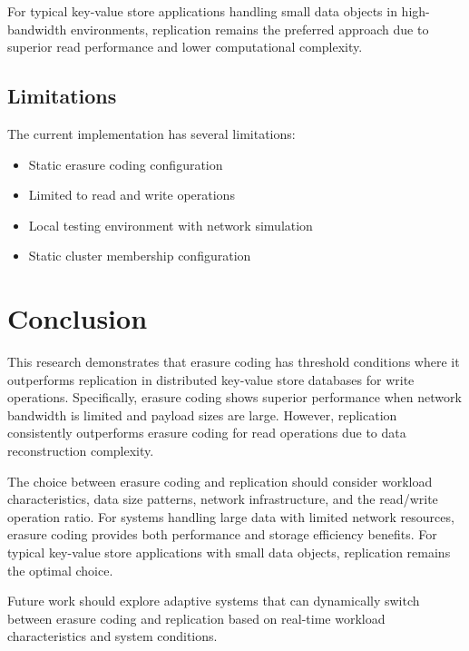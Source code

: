 For typical key-value store applications handling small data objects in high-bandwidth environments, replication remains the preferred approach due to superior read performance and lower computational complexity.

\subsection{Limitations}

The current implementation has several limitations:
\begin{itemize}
\item Static erasure coding configuration
\item Limited to read and write operations
\item Local testing environment with network simulation
\item Static cluster membership configuration
\end{itemize}

\section{Conclusion}

This research demonstrates that erasure coding has threshold conditions where it outperforms replication in distributed key-value store databases for write operations. Specifically, erasure coding shows superior performance when network bandwidth is limited and payload sizes are large. However, replication consistently outperforms erasure coding for read operations due to data reconstruction complexity.

The choice between erasure coding and replication should consider workload characteristics, data size patterns, network infrastructure, and the read/write operation ratio. For systems handling large data with limited network resources, erasure coding provides both performance and storage efficiency benefits. For typical key-value store applications with small data objects, replication remains the optimal choice.

Future work should explore adaptive systems that can dynamically switch between erasure coding and replication based on real-time workload characteristics and system conditions.